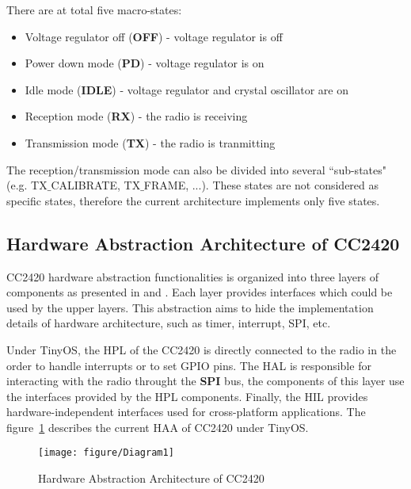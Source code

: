 \documentclass[a4paper,11pt]{article}
\begin{document}
There are at total five macro-states:
  \begin{itemize}
    \item Voltage regulator off (\textbf{OFF}) - voltage regulator is off
    \item Power down mode (\textbf{PD}) - voltage regulator is on
    \item Idle mode (\textbf{IDLE}) - voltage regulator and crystal oscillator are on
    \item Reception mode (\textbf{RX}) - the radio is receiving
    \item Transmission mode (\textbf{TX}) - the radio is tranmitting
  \end{itemize}

The reception/transmission mode can also be divided into several ``sub-states" (e.g. TX$\_$CALIBRATE, TX$\_$FRAME, ...). These states are not considered as specific states, therefore the current architecture implements only five states.

  \subsection{Hardware Abstraction Architecture of CC2420}

CC2420 hardware abstraction functionalities is organized into three layers of components as presented in \cite{tep2} and \cite{tep126}. Each layer provides interfaces which could be used by the upper layers. This abstraction aims to hide the implementation details of hardware architecture, such as timer, interrupt, SPI, etc.

Under TinyOS, the HPL of the CC2420 is directly connected to the radio in the order to handle interrupts or to set GPIO pins.
The HAL is responsible for interacting with the radio throught the \textbf{SPI} bus, the components of this layer use the interfaces provided by the HPL components.
Finally, the HIL provides hardware-independent interfaces used for cross-platform applications.
The figure~\ref{fig:haa} describes the current HAA of CC2420 under TinyOS.

	\begin{figure}[h]
    \centering
		\texttt{[image: figure/Diagram1]}
		\caption{Hardware Abstraction Architecture of CC2420}
    \label{fig:haa}
	\end{figure}

\section{}
\end{document}

